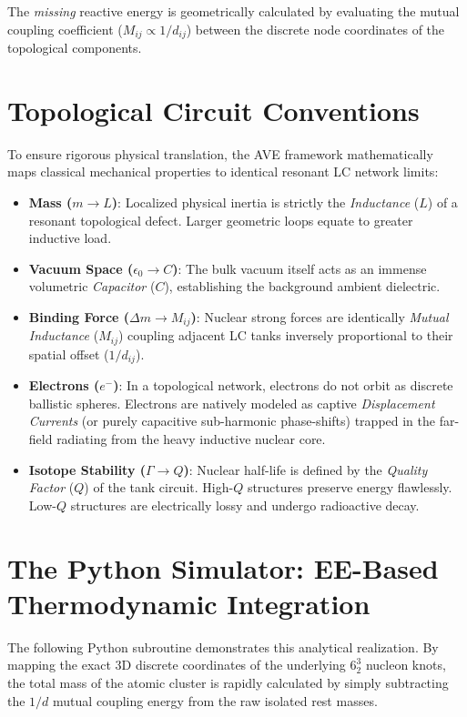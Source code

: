 The \textit{missing} reactive energy is geometrically calculated by evaluating the mutual coupling coefficient ($M_{ij} \propto 1/d_{ij}$) between the discrete node coordinates of the topological components.

\section{Topological Circuit Conventions}
To ensure rigorous physical translation, the AVE framework mathematically maps classical mechanical properties to identical resonant LC network limits:
\begin{itemize}
    \item \textbf{Mass ($m \rightarrow L$)}: Localized physical inertia is strictly the \textit{Inductance} ($L$) of a resonant topological defect. Larger geometric loops equate to greater inductive load.
    \item \textbf{Vacuum Space ($\epsilon_0 \rightarrow C$)}: The bulk vacuum itself acts as an immense volumetric \textit{Capacitor} ($C$), establishing the background ambient dielectric.
    \item \textbf{Binding Force ($\Delta m \rightarrow M_{ij}$)}: Nuclear strong forces are identically \textit{Mutual Inductance} ($M_{ij}$) coupling adjacent LC tanks inversely proportional to their spatial offset ($1/d_{ij}$).
    \item \textbf{Electrons ($e^-$)}: In a topological network, electrons do not orbit as discrete ballistic spheres. Electrons are natively modeled as captive \textit{Displacement Currents} (or purely capacitive sub-harmonic phase-shifts) trapped in the far-field radiating from the heavy inductive nuclear core.
    \item \textbf{Isotope Stability ($\Gamma \rightarrow Q$)}: Nuclear half-life is defined by the \textit{Quality Factor} ($Q$) of the tank circuit. High-$Q$ structures preserve energy flawlessly. Low-$Q$ structures are electrically lossy and undergo radioactive decay.
\end{itemize}

\section{The Python Simulator: EE-Based Thermodynamic Integration}
The following Python subroutine demonstrates this analytical realization. By mapping the exact 3D discrete coordinates of the underlying $6^3_2$ nucleon knots, the total mass of the atomic cluster is rapidly calculated by simply subtracting the $1/d$ mutual coupling energy from the raw isolated rest masses.

